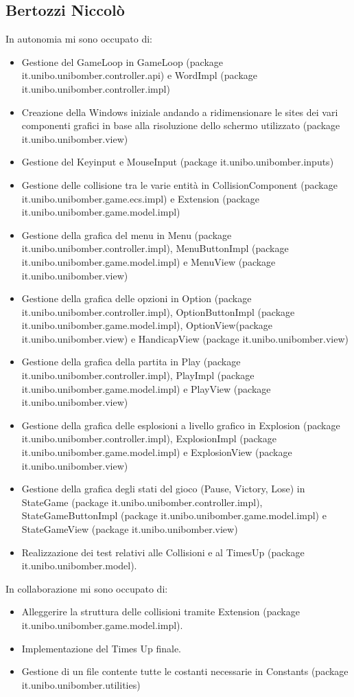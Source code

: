 \documentclass[a4paper,12pt]{report}
\begin{document}
\subsection*{Bertozzi Niccolò}
In autonomia mi sono occupato di:
\begin{itemize}
    \item Gestione del GameLoop in GameLoop (package it.unibo.unibomber.controller.api) e WordImpl (package it.unibo.unibomber.controller.impl)
    \item Creazione della Windows iniziale andando a ridimensionare le sites dei vari componenti grafici in base alla risoluzione dello schermo utilizzato (package it.unibo.unibomber.view)
    \item Gestione del Keyinput e MouseInput (package it.unibo.unibomber.inputs)
    \item Gestione delle collisione tra le varie entità in CollisionComponent (package it.unibo.unibomber.game.ecs.impl) e Extension (package it.unibo.unibomber.game.model.impl)
    \item Gestione della grafica del menu in Menu (package it.unibo.unibomber.controller.impl), MenuButtonImpl (package it.unibo.unibomber.game.model.impl) e MenuView (package it.unibo.unibomber.view)
    \item Gestione della grafica delle opzioni in Option (package it.unibo.unibomber.controller.impl), OptionButtonImpl (package it.unibo.unibomber.game.model.impl), OptionView(package it.unibo.unibomber.view) e HandicapView (package it.unibo.unibomber.view)
    \item Gestione della grafica della partita in Play (package it.unibo.unibomber.controller.impl), PlayImpl (package it.unibo.unibomber.game.model.impl) e PlayView (package it.unibo.unibomber.view)
    \item Gestione della grafica delle esplosioni a livello grafico  in Explosion (package it.unibo.unibomber.controller.impl), ExplosionImpl (package it.unibo.unibomber.game.model.impl) e ExplosionView (package it.unibo.unibomber.view)
    \item Gestione della grafica degli stati del gioco (Pause, Victory, Lose) in StateGame (package it.unibo.unibomber.controller.impl), StateGameButtonImpl (package it.unibo.unibomber.game.model.impl) e StateGameView (package it.unibo.unibomber.view)
    \item Realizzazione dei test relativi alle Collisioni e al TimesUp  (package it.unibo.unibomber.model).
\end{itemize}
In collaborazione mi sono occupato di:
\begin{itemize}
    \item Alleggerire la struttura delle collisioni tramite Extension (package it.unibo.unibomber.game.model.impl).
    \item Implementazione del Times Up finale.
    \item Gestione di un file contente tutte le costanti necessarie in Constants (package it.unibo.unibomber.utilities)
\end{itemize}
\end{document}
